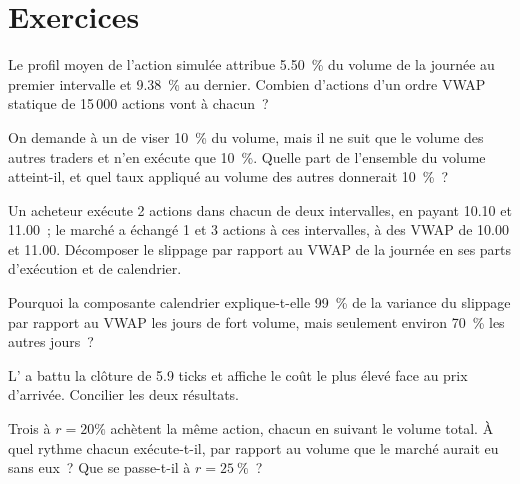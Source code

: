 \section{Exercices}

\begin{exercise}[$\star$]\label{exo:mx:benchmark-algorithms:1}
Le profil moyen de l'action simulée attribue 5.50~\% du volume de la journée au premier intervalle et 9.38~\% au dernier. Combien d'actions d'un ordre VWAP statique de
15\,000 actions vont à chacun~?
\end{exercise}

\begin{exercise}[$\star$]\label{exo:mx:benchmark-algorithms:2}
On demande à un  de viser 10~\% du volume, mais il ne suit que le volume des autres traders et n'en exécute que 10~\%. Quelle part de l'ensemble du
volume atteint-il, et quel taux appliqué au volume des autres donnerait 10~\%~?
\end{exercise}

\begin{exercise}[$\star$]\label{exo:mx:benchmark-algorithms:3}
Un acheteur exécute 2 actions dans chacun de deux intervalles, en payant 10.10 et 11.00~; le marché a échangé 1 et 3 actions à ces intervalles, à des VWAP de 10.00 et 11.00. Décomposer le
slippage par rapport au VWAP de la journée en ses parts d'exécution et de calendrier.
\end{exercise}

\begin{exercise}[$\star\star$]\label{exo:mx:benchmark-algorithms:4}
Pourquoi la composante calendrier explique-t-elle 99~\% de la variance du slippage par rapport au VWAP les jours de fort volume, mais seulement environ 70~\% les autres jours~?
\end{exercise}

\begin{exercise}[$\star\star$]\label{exo:mx:benchmark-algorithms:5}
L' a battu la clôture de 5.9 ticks et affiche le coût le plus élevé face au prix d'arrivée. Concilier les deux résultats.
\end{exercise}

\begin{exercise}[$\star\star$]\label{exo:mx:benchmark-algorithms:6}
Trois  à $r=20\%$ achètent la même action, chacun en suivant le volume total. À quel rythme chacun exécute-t-il, par rapport au volume
que le marché aurait eu sans eux~? Que se passe-t-il à $r=25~\%$~?
\end{exercise}

